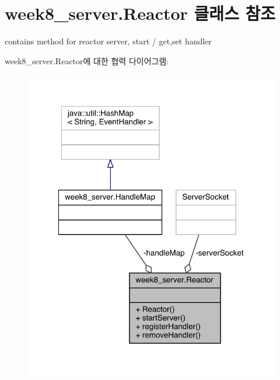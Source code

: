 \hypertarget{classweek8__server_1_1_reactor}{\section{week8\-\_\-server.\-Reactor 클래스 참조}
\label{classweek8__server_1_1_reactor}
}


contains method for reactor server, start / get,set handler  




week8\-\_\-server.\-Reactor에 대한 협력 다이어그램\-:
\nopagebreak
\begin{figure}[H]
\begin{center}
\leavevmode
\includegraphics[width=318pt]{classweek8__server_1_1_reactor__coll__graph}
\end{center}
\end{figure}
